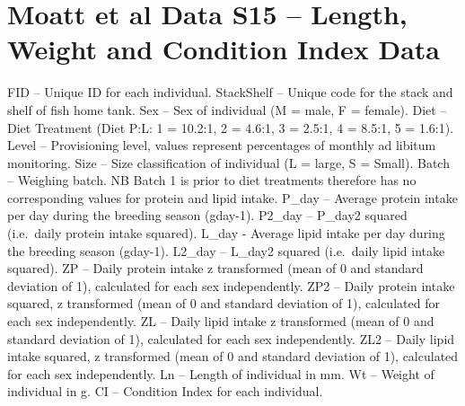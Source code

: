 \documentclass[]{book}
\begin{document}
\hypertarget{moatt-et-al-data-s15-length-weight-and-condition-index-data}{%
\section{Moatt et al Data S15 -- Length, Weight and Condition Index Data}\label{moatt-et-al-data-s15-length-weight-and-condition-index-data}}

FID -- Unique ID for each individual.
StackShelf -- Unique code for the stack and shelf of fish home tank.
Sex -- Sex of individual (M = male, F = female).
Diet -- Diet Treatment (Diet P:L: 1 = 10.2:1, 2 = 4.6:1, 3 = 2.5:1, 4 = 8.5:1, 5 = 1.6:1).
Level -- Provisioning level, values represent percentages of monthly ad libitum monitoring.
Size -- Size classification of individual (L = large, S = Small).
Batch -- Weighing batch. NB Batch 1 is prior to diet treatments therefore has no corresponding values for protein and lipid intake.
P\_day -- Average protein intake per day during the breeding season (gday-1).
P2\_day -- P\_day2 squared (i.e.~daily protein intake squared).
L\_day - Average lipid intake per day during the breeding season (gday-1).
L2\_day -- L\_day2 squared (i.e.~daily lipid intake squared).
ZP -- Daily protein intake z transformed (mean of 0 and standard deviation of 1), calculated for each sex independently.
ZP2 -- Daily protein intake squared, z transformed (mean of 0 and standard deviation of 1), calculated for each sex independently.
ZL -- Daily lipid intake z transformed (mean of 0 and standard deviation of 1), calculated for each sex independently.
ZL2 -- Daily lipid intake squared, z transformed (mean of 0 and standard deviation of 1), calculated for each sex independently.
Ln -- Length of individual in mm.
Wt -- Weight of individual in g.
CI -- Condition Index for each individual.


\end{document}
